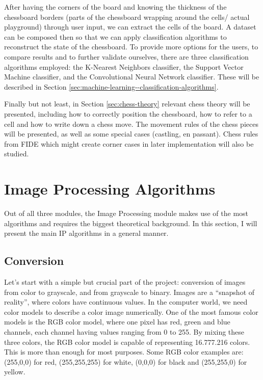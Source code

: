 After having the corners of the board and knowing the thickness of the chessboard borders (parts of the chessboard wrapping around the cells/ actual playground) through user input, we can extract the cells of the board. A dataset can be composed then so that we can apply classification algorithms to reconstruct the state of the chessboard. To provide more options for the users, to compare results and to further validate ourselves, there are three classification algorithms employed: the K-Nearest Neighbors classifier, the Support Vector Machine classifier, and the Convolutional Neural Network classifier. These will be described in Section \ref{sec:machine-learning--classification-algorithms}.

Finally but not least, in Section \ref{sec:chess-theory} relevant chess theory will be presented, including how to correctly position the chessboard, how to refer to a cell and how to write down a chess move. The movement rules of the chess pieces will be presented, as well as some special cases (castling, en passant). Chess rules from FIDE\cite{fide} which might create corner cases in later implementation will also be studied.



\section{Image Processing Algorithms} \label{sec:image-processing-algorithms}

Out of all three modules, the Image Processing module makes use of the most algorithms and requires the biggest theoretical background. In this section, I will present the main IP algorithms in a general manner.



\subsection{Conversion} \label{subsec:conversion}

Let's start with a simple but crucial part of the project: conversion of images from color to grayscale, and from grayscale to binary. Images are a ``snapshot of reality'', where colors have continuous values. In the computer world, we need color models to describe a color image numerically. One of the most famous color models is the RGB color model, where one pixel has red, green and blue channels, each channel having values ranging from 0 to 255. By mixing these three colors, the RGB color model is capable of representing 16.777.216 colors. This is more than enough for most purposes. Some RGB color examples are: (255,0,0) for red, (255,255,255) for white, (0,0,0) for black and (255,255,0) for yellow.

